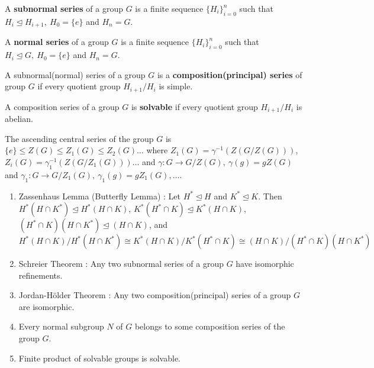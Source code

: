 \begin{definition}
	A \textbf{subnormal series} of a group $G$ is a finite sequence $\{ H_i \}_{i=0}^n$ such that $H_i \trianglelefteq H_{i+1},\ H_0 = \{ e \}$ and $H_n = G$.
\end{definition}

\begin{definition}
	A \textbf{normal series} of a group $G$ is a finite sequence $\{ H_i \}_{i=0}^n$ such that $H_i \trianglelefteq G,\ H_0 = \{ e \}$ and $H_n = G$.
\end{definition}

\begin{definition}
	A subnormal(normal) series of a group $G$ is a \textbf{composition(principal) series} of group $G$ if every quotient group $H_{i+1}/H_i$ is simple.
\end{definition}

\begin{definition}
	A composition series of a group $G$ is \textbf{solvable} if every quotient group $H_{i+1}/H_i$ is abelian.
\end{definition}

\begin{definition}
	The ascending central series of the group $G$ is $\{ e \} \le Z(G) \le Z_1(G) \le Z_2(G) \dots$ where $Z_1(G) = \gamma^{-1}(Z(G/Z(G)))$, $Z_i(G) = \gamma_1^{-1}(Z(G/Z_1(G))) \dots$ and $\gamma : G \to G/Z(G),\ \gamma(g) = gZ(G)$ and $\gamma_1 : G \to G/Z_1(G),\ \gamma_1(g) = gZ_1(G),\dots$.
\end{definition}

\begin{enumerate}
	\item Zassenhaus Lemma (Butterfly Lemma) : Let $H^\ast \trianglelefteq H$ and $K^\ast \trianglelefteq K$. Then 
	\subitem $H^\ast(H \cap K^\ast) \trianglelefteq H^\ast(H \cap K)$,
	\subitem $K^\ast(H^\ast \cap K) \trianglelefteq K^\ast(H \cap K)$,
	\subitem $(H^\ast \cap K)(H \cap K^\ast) \trianglelefteq (H \cap K)$, and 
		$$ H^\ast(H \cap K)/H^\ast(H \cap K^\ast) \cong K^\ast(H \cap K)/K^\ast(H^\ast \cap K) \cong (H \cap K)/(H^\ast \cap K)(H \cap K^\ast) $$
	\item Schreier Theorem : Any two subnormal series of a group $G$ have isomorphic refinements.
	\item Jordan-H\"older Theorem : Any two composition(principal) series of a group $G$ are isomorphic.
	\item Every normal subgroup $N$ of $G$ belongs to some composition series of the group $G$.
	\item Finite product of solvable groups is solvable.
\end{enumerate}

